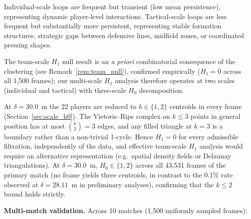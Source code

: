 Individual-scale loops are frequent but transient (low mean persistence), representing dynamic player-level interactions. Tactical-scale loops are less frequent but substantially more persistent, representing stable formation structures, strategic gaps between defensive lines, midfield zones, or coordinated pressing shapes.

The team-scale \(H_1\) null result is an \emph{a priori} combinatorial consequence of the clustering (see Remark~\ref{rem:team_null}), confirmed empirically (\(H_1=0\) across all 1,500 frames); our multi-scale \(H_1\) analysis therefore operates at two scales (individual and tactical) with three-scale \(H_0\) decomposition.

\begin{remark}\label{rem:team_null}
At \(\delta=30.0\)~m the 22 players are reduced to \(k\in\{1,2\}\) centroids in every frame (Section~\ref{sec:scale_h0}). The Vietoris--Rips complex on \(k\leq 3\) points in general position has at most \(\binom{k}{2}=3\) edges, and any filled triangle at \(k=3\) is a boundary rather than a non-trivial 1-cycle. Hence \(H_1=0\) for every admissible filtration, independently of the data, and effective team-scale \(H_1\) analysis would require an alternative representation (e.g.\ spatial density fields or Delaunay triangulations). At \(\delta=30.0\)~m, \(H_0\in\{1,2\}\) across all 43{,}531 frames of the primary match (no frame yields three centroids, in contrast to the 0.1\% rate observed at \(\delta=28.11\)~m in preliminary analyses), confirming that the \(k\leq 2\) bound holds strictly.
\end{remark}

\textbf{Multi-match validation.} Across 10 matches (1,500 uniformly sampled frames):

\begin{table}[H]
  \centering
  \caption{Multi-match \(H_1\) statistics (10 matches). Presence rates are given with 95\% bootstrap CIs (1{,}000 resamples over matches).}
  \label{tab:h1multi}
\end{table}

